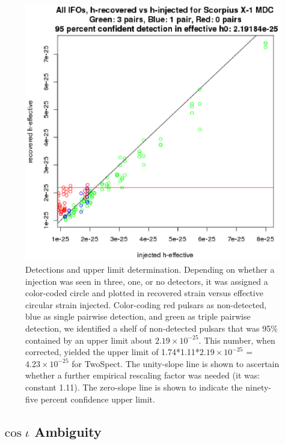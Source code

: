 \begin{figure}
\begin{center}
\includegraphics[width=0.5\paperwidth,height=0.35\paperheight]{HrecoveredVsHeffectiveFullUL.eps}
\caption{Detections and upper limit determination.
Depending on whether a injection was seen in three, one, or no detectors, it was assigned a color-coded circle and plotted in recovered strain versus effective circular strain injected.
Color-coding red pulsars as non-detected, blue as single pairwise detection, and green as triple pairwise detection, we identified a shelf of non-detected pulsars that was 95\% contained by an upper limit about $2.19 \times 10^{-25}$. This number, when corrected, yielded the upper limit of 1.74*1.11*$2.19 \times 10^{-25}$ = $4.23 \times 10^{-25}$ for TwoSpect. 
The unity-slope line is shown to ascertain whether a further empirical rescaling factor was needed (it was: constant 1.11).
The zero-slope line is shown to indicate the ninety-five percent confidence upper limit.
\label{fig:hrecoveredvsheffectivefullul}}
\end{center}
\end{figure}


\subsection{$\cos \iota$ Ambiguity}


